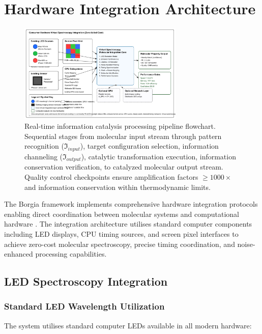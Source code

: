 \documentclass[12pt,a4paper]{article}
\begin{document}
\section{Hardware Integration Architecture}\begin{figure}[H]
    \centering
    \includegraphics[width=0.7\textwidth]{images/hardware_integration.pdf}
    \caption{Real-time information catalysis processing pipeline flowchart. Sequential stages from molecular input stream through pattern recognition ($\mathfrak{I}_{input}$), target configuration selection, information channeling ($\mathfrak{I}_{output}$), catalytic transformation execution, information conservation verification, to catalyzed molecular output stream. Quality control checkpoints ensure amplification factors $\geq 1000\times$ and information conservation within thermodynamic limits.}
    \label{fig:hardware}
    \end{figure}


The Borgia framework implements comprehensive hardware integration protocols enabling direct coordination between molecular systems and computational hardware \cite{sterling2015principles}. The integration architecture utilises standard computer components including LED displays, CPU timing sources, and screen pixel interfaces to achieve zero-cost molecular spectroscopy, precise timing coordination, and noise-enhanced processing capabilities.

\subsection{LED Spectroscopy Integration}

\subsubsection{Standard LED Wavelength Utilization}

The system utilises standard computer LEDs available in all modern hardware:
\end{document}
